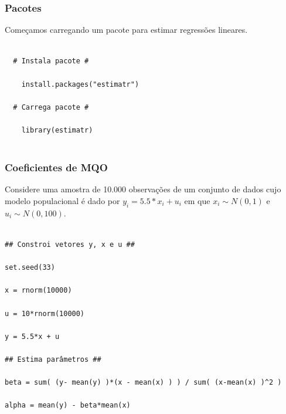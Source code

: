 \documentclass[10pt,slides,xcolor=pdftex,dvipsnames,table]{beamer}
\begin{document}

\begin{frame}[fragile]
	\frametitle{Pacotes}

\vspace{0.5cm}
Começamos carregando um pacote para estimar regressões lineares.

\begin{lstlisting}

  # Instala pacote #	

    install.packages("estimatr")

  # Carrega pacote #  
      
	library(estimatr)
   
\end{lstlisting}

\end{frame}


\begin{frame}[fragile]
	\frametitle{Coeficientes de MQO}
	
\vspace{0.5cm}

Considere uma amostra de 10.000 observações de um conjunto de dados cujo modelo populacional é dado por $y_i = 5.5*x_i + u_i$ em que  $x_i \sim N(0,1)$ e $u_i \sim N (0,100)$.  

\begin{lstlisting}

## Constroi vetores y, x e u ## 

set.seed(33)

x = rnorm(10000)

u = 10*rnorm(10000)

y = 5.5*x + u

## Estima parâmetros ##

beta = sum( (y- mean(y) )*(x - mean(x) ) ) / sum( (x-mean(x) )^2 )

alpha = mean(y) - beta*mean(x)   

\end{lstlisting}

\end{frame}

\end{document}
